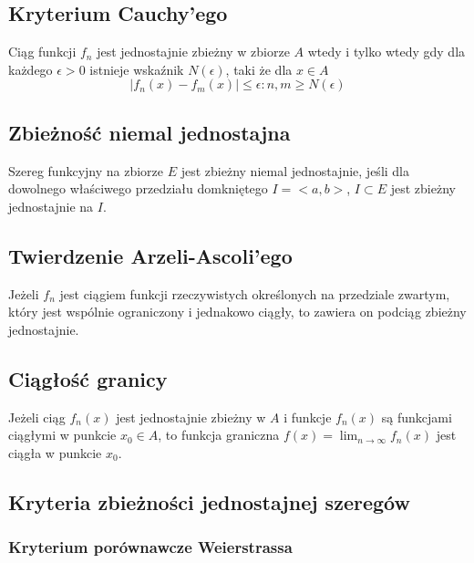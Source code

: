 \documentclass{../notatki}
\begin{document}
\subsection{Kryterium Cauchy'ego}

Ciąg funkcji $f_n$ jest jednostajnie zbieżny w zbiorze $A$ wtedy i tylko wtedy
gdy dla każdego $\epsilon > 0$ istnieje wskaźnik $N(\epsilon)$, taki że dla
$x \in A$
$$
|f_n(x) - f_m(x)| \le \epsilon : n,m \ge N(\epsilon)
$$

\subsection{Zbieżność niemal jednostajna}

Szereg funkcyjny na zbiorze $E$ jest zbieżny niemal jednostajnie, jeśli dla
dowolnego właściwego przedziału domkniętego $I = <a, b>$, $I \subset E$ jest
zbieżny jednostajnie na $I$.

\subsection{Twierdzenie Arzeli-Ascoli'ego}

Jeżeli $f_n$ jest ciągiem funkcji rzeczywistych określonych na przedziale
zwartym, który jest wspólnie ograniczony i jednakowo ciągły, to zawiera
on podciąg zbieżny jednostajnie.


\subsection{Ciągłość granicy}

Jeżeli ciąg $f_n(x)$ jest jednostajnie zbieżny w $A$ i funkcje $f_n(x)$ są
funkcjami ciągłymi w punkcie $x_0 \in A$, to funkcja graniczna $f(x)
= \lim_{n \to \infty} f_n(x)$ jest ciągła w punkcie $x_0$.

\subsection{Kryteria zbieżności jednostajnej szeregów}

\subsubsection{Kryterium porównawcze Weierstrassa}
\end{document}
